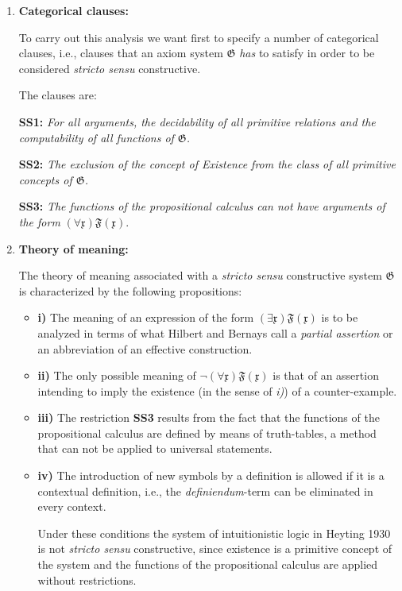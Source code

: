 \documentclass[12pt]{article}
\begin{document}
\begin{enumerate}

\item \textbf{Categorical clauses:}

To carry out this analysis we want first to specify a number of categorical clauses, i.e., clauses that an axiom system $\mathfrak{G}$ \emph{has} to satisfy in order to be considered \emph{stricto sensu} constructive.

The clauses are:

\textbf{SS1:} \emph{For all arguments, the decidability of all primitive relations and the computability of all functions of $\mathfrak{G}$.}

\textbf{SS2:} \emph{The exclusion of the concept of Existence from the class of all primitive concepts of $\mathfrak{G}$.}

\textbf{SS3:} \emph{The functions of the propositional calculus can not have arguments of the form} $(\forall \mathfrak{x}) \mathfrak{F} (\mathfrak{x}).$

\item \textbf{Theory of meaning:}

The theory of meaning associated with a \emph{stricto sensu} constructive system $\mathfrak{G}$ is characterized by the following propositions:

\begin{itemize}

\item \textbf{i)} The meaning of an expression of the form $(\exists \mathfrak{x}) \mathfrak{F} (\mathfrak{x})$ is to be analyzed in terms of what Hilbert and Bernays call a \emph{partial assertion} or an abbreviation of an effective construction.

\item \textbf{ii)} The only possible meaning of $\neg (\forall \mathfrak{x}) \mathfrak{F} (\mathfrak{x})$ is that of an assertion intending to imply the existence (in the sense of \emph{i)}) of a counter-example.

\item \textbf{iii)} The restriction \textbf{SS3} results from the fact that the functions of the propositional calculus are defined by means of truth-tables, a method that can not be applied to universal statements.

\item \textbf{iv)} The introduction of new symbols by a definition is allowed if it is a contextual definition, i.e., the \emph{definiendum}-term can be eliminated in every context.

Under these conditions the system of intuitionistic logic in Heyting 1930 is not \emph{stricto sensu} constructive, since existence is a primitive concept of the system and the functions of the propositional calculus are applied without restrictions.

\end{itemize}

\end{enumerate}
\end{document}
